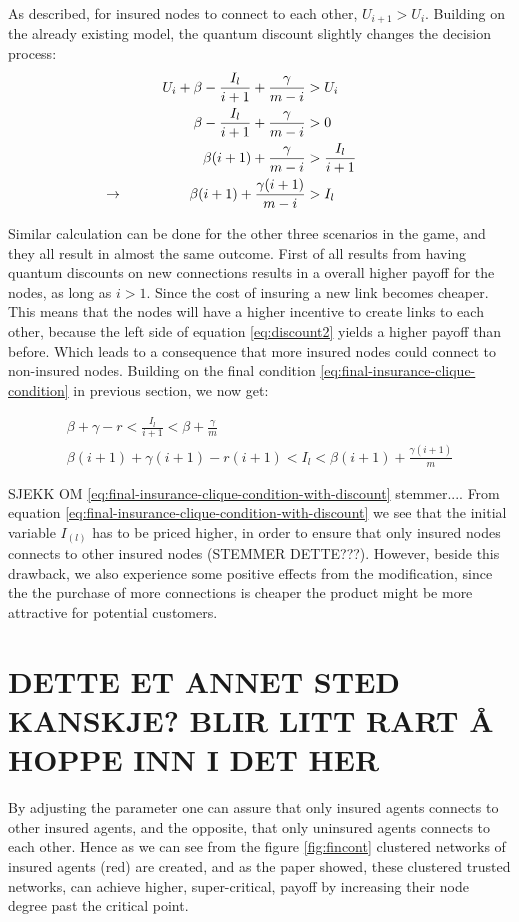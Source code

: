 As described, for insured nodes to connect to each other, $U_{i+1} > U_{i}$. Building on the already existing model, the quantum discount slightly changes the decision process:
\begin{eqnarray}
U_{i}+\beta-\frac{I_{l}}{i+1}+\frac{\gamma}{m-i}&>U_{i} \nonumber \\ 
\beta-\frac{I_{l}}{i+1}+\frac{\gamma}{m-i}&>0 \nonumber \\ 
\beta (i+1)+\frac{\gamma}{m-i}&>\frac{I_{l}}{i+1} \nonumber \\
\llap{$\rightarrow$\hspace{50pt}}  \beta (i+1)+\frac{\gamma (i+1)}{m-i}&>I_{l}
\label{eq:discount2}
\end{eqnarray}

Similar calculation can be done for the other three scenarios in the game, and they all result in almost the same outcome. First of all results from having quantum discounts on new connections results in a overall higher payoff for the nodes, as long as $i>1$. Since the cost of insuring a new link becomes cheaper. This means that the nodes will have a higher incentive to create links to each other, because the left side of equation \ref{eq:discount2} yields a higher payoff than before. Which leads to a consequence that more insured nodes could connect to non-insured nodes. 
Building on the final condition \ref{eq:final-insurance-clique-condition} in previous section, we now get:

\begin{eqnarray}
\beta+\gamma-r<\frac{I_{l}}{i+1}<\beta+\frac{\gamma}{m} \nonumber \\
\beta(i+1)+\gamma(i+1)-r(i+1)<I_{l}<\beta(i+1)+\frac{\gamma(i+1)}{m}
\label{eq:final-insurance-clique-condition-with-discount}
\end{eqnarray}

SJEKK OM \ref{eq:final-insurance-clique-condition-with-discount} stemmer.... 
From equation \ref{eq:final-insurance-clique-condition-with-discount} we see that the initial variable $I_(l)$ has to be priced higher, in order to ensure that only insured nodes connects to other insured nodes (STEMMER DETTE???). However, beside this drawback, we also experience some positive effects from the modification, since the the purchase of more connections is cheaper the product might be more attractive for potential customers. 


\section{DETTE ET ANNET STED KANSKJE? BLIR LITT RART Å HOPPE INN I DET HER}
By adjusting the parameter one can assure that only insured agents connects to other insured agents, and the opposite,
that only uninsured agents connects to each other. Hence as we can see from the figure \ref{fig:fincont} clustered
networks of insured agents (red) are created, and  as the paper \cite{contagion} showed, these clustered trusted
networks, can achieve higher, super-critical, payoff by increasing their node degree past the critical point.

